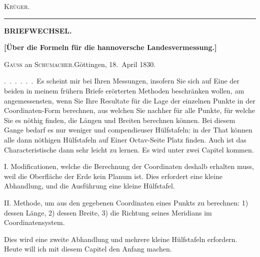 \begin{flushright}\textsc{Krüger.}\end{flushright}
\begin{center}\rule{7cm}{.5pt}\end{center}
\par\endgroup
\clearpage
\vspace*{1.3cm}
\begin{center}
{\Large\bfseries BRIEFWECHSEL.}\par
\vspace{1.7cm}
{\large\bfseries [Über die Formeln für die hannoversche Landesvermessung.]}\par
\bigskip
\textsc{Gauss} an \textsc{Schumacher}.\quad Göttingen, 18.~April 1830.
\end{center}
\medskip
.\ .\ .\ .\ .\ .\ Es scheint mir bei Ihren Messungen, insofern Sie sich auf Eine der beiden in meinem frühern Briefe erörterten Methoden beschränken wollen, am angemessensten, wenn Sie Ihre Resultate für die Lage der einzelnen Punkte in der Coordinaten-Form berechnen, aus welchen Sie nachher für alle Punkte, für welche Sie es nöthig finden, die Längen und Breiten berechnen können. Bei diesem Gange bedarf es nur weniger und compendieuser Hülfstafeln: in der That können alle dann nöthigen Hülfstafeln auf Einer Octav-Seite Platz finden. Auch ist das Characteristische dann sehr leicht zu lernen. Es wird unter zwei Capitel kommen.

I. Modificationen, welche die Berechnung der Coordinaten deshalb erhalten muss, weil die Oberfläche der Erde kein Planum ist. Dies erfordert eine kleine Abhandlung, und die Ausführung eine kleine Hülfstafel.

II. Methode, um aus den gegebenen Coordinaten eines Punkts zu berechnen: 1) dessen Länge, 2) dessen Breite, 3) die Richtung seines Meridians im Coordinatensystem.

Dies wird eine zweite Abhandlung und mehrere kleine Hülfstafeln erfordern. Heute will ich mit diesem Capitel den Anfang machen.

